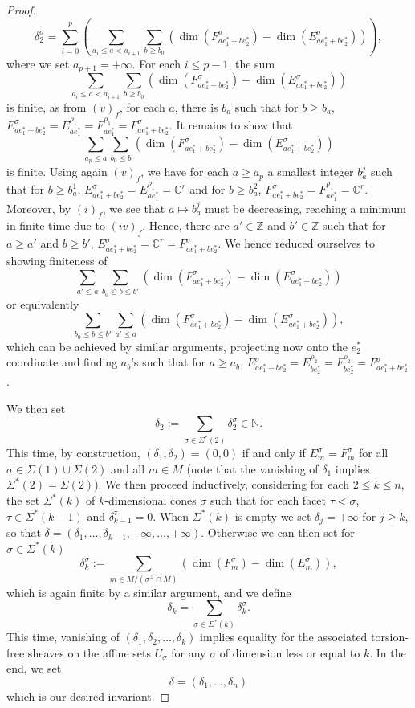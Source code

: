 \documentclass[a4paper,10pt]{amsart}
\theoremstyle{plain}{
    \newtheorem{theorem}{Theorem}[section]
    \newtheorem{lemma}[theorem]{Lemma}
    \newtheorem{corollary}[theorem]{Corollary}
    \newtheorem{proposition}[theorem]{Proposition}
    \newtheorem{conjecture}[theorem]{Conjecture}
}
\theoremstyle{definition}{
    \newtheorem{definition}[theorem]{Definition}
    \newtheorem{defn-thm}[theorem]{Definition-Theorem}
    \newtheorem{example}[theorem]{Example}
    \newtheorem{notation}[theorem]{Notation}
}
\theoremstyle{remark}{
    \newtheorem{remark}[theorem]{Remark}
    \newtheorem{problem}[theorem]{Problem}
    \newtheorem{question}[theorem]{Question}
}
\def\Z{\mathbb{Z}}
\def\N{\mathbb{N}}
\def\C{\mathbb{C}}
\begin{document}
\begin{proof}
 $$
 \delta_2^\sigma=\sum_{i=0}^p\left(\sum_{ a_i\leq a< a_{i+1}}\sum_{ b\geq b_0} (\dim(F^\sigma_{a e_1^* + b e_2^*})-\dim(E^\sigma_{a e_1^* + b e_2^*}))\right),
 $$
 where we set $a_{p+1}=+\infty$. For each $i\leq p-1$, the sum 
 $$
 \sum_{ a_i\leq a< a_{i+1}}\sum_{b\geq b_0} (\dim(F^\sigma_{a e_1^* + b e_2^*})-\dim(E^\sigma_{a e_1^* + b e_2^*}))
 $$
 is finite, as from $(v)_f$, for each $a$, there is $b_a$ such that for $b\geq b_a$, $E^\sigma_{a e_1^*+b e_2^*}=E^{\rho_1}_{a e_1^*}=F^{\rho_1}_{a e_1^*}=F^\sigma_{a e_1^*+b e_2^*}$. It remains to show that 
 $$
 \sum_{ a_p\leq a}\sum_{b_0\leq b} (\dim(F^\sigma_{a e_1^* + b e_2^*})-\dim(E^\sigma_{a e_1^* + b e_2^*}))
 $$
 is finite. Using again $(v)_f$, we have for each $a\geq a_p$ a smallest integer $b_a^j$ such that for $b\geq b_a^1$, $E^\sigma_{a e_1^*+b e_2^*}=E^{\rho_1}_{a e_1^*}=\C^r$ and for $b\geq b_a^2$, $F^\sigma_{a e_1^*+b e_2^*}=F^{\rho_1}_{a e_1^*}=\C^r$. Moreover, by $(i)_f$, we see that $a\mapsto b_a^j$ must be decreasing, reaching a minimum in finite time due to $(iv)_f$. Hence, there are $a'\in \Z$ and $b'\in\Z$ such that for $a\geq a'$ and $b\geq b'$, $E^\sigma_{a e_1^*+b e_2^*}=\C^r=F^\sigma_{a e_1^*+b e_2^*}$. We hence reduced ourselves to showing finiteness of
 $$
 \sum_{ a'\leq a}\sum_{b_0\leq b\leq b'} (\dim(F^\sigma_{a e_1^* + b e_2^*})-\dim(E^\sigma_{a e_1^* + b e_2^*}))
 $$
 or equivalently
 $$
 \sum_{b_0\leq b\leq b'} \sum_{ a'\leq a}(\dim(F^\sigma_{a e_1^* + b e_2^*})-\dim(E^\sigma_{a e_1^* + b e_2^*})),
 $$
 which can be achieved by similar arguments, projecting now onto the $e_2^*$ coordinate and finding $a_b$'s such that for $a\geq a_b$, $E^\sigma_{a e_1^*+b e_2^*}=E^{\rho_2}_{b e_2^*}=F^{\rho_2}_{b e_2^*}=F^\sigma_{a e_1^*+b e_2^*}$.
 
 We then set 
 $$
 \delta_2:=\sum_{\sigma\in\Sigma^*(2)} \delta_2^\sigma\in\N.
 $$
 This time, by construction, $(\delta_1,\delta_2)=(0,0)$ if and only if $E_m^\sigma=F_m^\sigma$ for all $\sigma\in\Sigma(1)\cup\Sigma(2)$ and all $m\in M$ (note that the vanishing of $\delta_1$ implies $\Sigma^*(2)=\Sigma(2)$). We then proceed inductively, considering for each $2\leq k\leq n$, the set $\Sigma^*(k)$ of $k$-dimensional cones $\sigma$ such that for each facet $\tau < \sigma$, $\tau\in\Sigma^*(k-1)$ and $\delta_{k-1}^\tau=0$. When $\Sigma^*(k)$ is empty we set $\delta_j=+\infty$ for $j\geq k$, so that $\delta=(\delta_1,\ldots,\delta_{k-1},+\infty,\ldots,+\infty)$. Otherwise we can then set for $\sigma\in\Sigma^*(k)$
 $$
 \delta_k^\sigma:=\sum_{m\in M/(\sigma^\perp\cap M)} (\dim(F^\sigma_m)-\dim(E^\sigma_m)),
 $$
 which is again finite by a similar argument, and we define
 $$
 \delta_k=\sum_{\sigma\in\Sigma^*(k)} \delta_k^\sigma.
 $$
 This time, vanishing of $(\delta_1,\delta_2,\ldots,\delta_k)$ implies equality for the associated torsion-free sheaves on the affine sets $U_\sigma$ for any $\sigma$ of dimension less or equal to $k$. In the end, we set
 $$
 \delta=(\delta_1,\ldots,\delta_n)
 $$
 which is our desired invariant. 
 

\end{proof}
\end{document}
